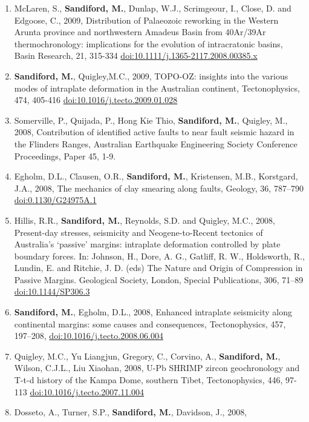 \documentclass[
]{article}
\begin{document}
\begin{enumerate}
\item
  McLaren, S., \textbf{Sandiford, M.}, Dunlap, W.J., Scrimgeour, I.,
  Close, D. and Edgoose, C., 2009, Distribution of Palaeozoic reworking
  in the Western Arunta province and northwestern Amadeus Basin from
  40Ar/39Ar thermochronology: implications for the evolution of
  intracratonic basins, Basin Research, 21, 315-334
  \url{doi:10.1111/j.1365-2117.2008.00385.x} 
\item
  \textbf{Sandiford, M.}, Quigley,M.C., 2009, TOPO-OZ: insights into the
  various modes of intraplate deformation in the Australian continent,
  Tectonophysics, 474, 405-416 \url{doi:10.1016/j.tecto.2009.01.028}
\item
  Somerville, P., Quijada, P., Hong Kie Thio, \textbf{Sandiford, M.},
  Quigley, M., 2008, Contribution of identified active faults to near
  fault seismic hazard in the Flinders Ranges, Australian Earthquake
  Engineering Society Conference Proceedings, Paper 45, 1-9.
\item
  Egholm, D.L., Clausen, O.R., \textbf{Sandiford, M.}, Kristensen, M.B.,
  Korstgard, J.A., 2008, The mechanics of clay smearing along faults,
  Geology, 36, 787--790 \url{doi:0.1130/G24975A.1}
\item
  Hillis, R.R., \textbf{Sandiford, M.}, Reynolds, S.D. and Quigley,
  M.C., 2008, Present-day stresses, seismicity and Neogene-to-Recent
  tectonics of Australia's `passive' margins: intraplate deformation
  controlled by plate boundary forces. In: Johnson, H., Dore, A. G.,
  Gatliff, R. W., Holdsworth, R., Lundin, E. and Ritchie, J. D. (eds)
  The Nature and Origin of Compression in Passive Margins. Geological
  Society, London, Special Publications, 306, 71--89
  \url{doi:10.1144/SP306.3} 
\item
  \textbf{Sandiford, M.}, Egholm, D.L., 2008, Enhanced intraplate
  seismicity along continental margins: some causes and consequences,
  Tectonophysics, 457, 197--208, \url{doi:10.1016/j.tecto.2008.06.004}
\item
  Quigley, M.C., Yu Liangjun, Gregory, C., Corvino, A.,
  \textbf{Sandiford, M.}, Wilson, C.J.L., Liu Xiaohan, 2008, U-Pb SHRIMP
  zircon geochronology and T-t-d history of the Kampa Dome, southern
  Tibet, Tectonophysics, 446, 97-113
  \url{doi:10.1016/j.tecto.2007.11.004} 
\item
  Dosseto, A., Turner, S.P., \textbf{Sandiford, M.}, Davidson, J., 2008,

\end{enumerate}
\end{document}
